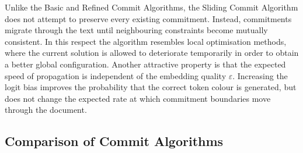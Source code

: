 \documentclass[a4paper,11pt]{llncs}
\begin{document}
Unlike the Basic and Refined Commit Algorithms, the Sliding Commit
Algorithm does not attempt to preserve every existing commitment.
Instead, commitments migrate through the text until neighbouring
constraints become mutually consistent. In this respect the algorithm
resembles local optimisation methods, where the current solution is
allowed to deteriorate temporarily in order to obtain a better global
configuration.
%
Another attractive property is that the expected speed of propagation
is independent of the embedding quality $\varepsilon$. Increasing the
logit bias improves the probability that the correct token colour is
generated, but does not change the expected rate at which commitment
boundaries move through the document.

\subsection{Comparison of Commit Algorithms}
\label{sec:commit-comparison}
\end{document}
